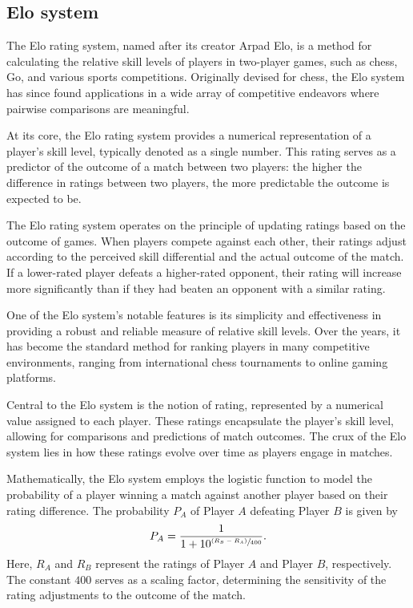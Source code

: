 \documentclass[preprint,aps,nofootinbib,a4paper,superscriptaddress,longbibliography,amsfonts,amssymb,amsmath,titlepage]{revtex4-2}
\begin{document}

\subsection{Elo system}

The Elo rating system, named after its creator Arpad Elo, is a method for calculating the relative skill levels of players in two-player games, such as chess, Go, and various sports competitions. Originally devised for chess, the Elo system has since found applications in a wide array of competitive endeavors where pairwise comparisons are meaningful.

At its core, the Elo rating system provides a numerical representation of a player's skill level, typically denoted as a single number. This rating serves as a predictor of the outcome of a match between two players: the higher the difference in ratings between two players, the more predictable the outcome is expected to be.

The Elo rating system operates on the principle of updating ratings based on the outcome of games. When players compete against each other, their ratings adjust according to the perceived skill differential and the actual outcome of the match. If a lower-rated player defeats a higher-rated opponent, their rating will increase more significantly than if they had beaten an opponent with a similar rating.

One of the Elo system's notable features is its simplicity and effectiveness in providing a robust and reliable measure of relative skill levels. Over the years, it has become the standard method for ranking players in many competitive environments, ranging from international chess tournaments to online gaming platforms.

Central to the Elo system is the notion of rating, represented by a numerical value assigned to each player. These ratings encapsulate the player's skill level, allowing for comparisons and predictions of match outcomes. The crux of the Elo system lies in how these ratings evolve over time as players engage in matches.

Mathematically, the Elo system employs the logistic function to model the probability of a player winning a match against another player based on their rating difference. The probability $P_A$ of Player $A$ defeating Player $B$ is given by
%
\begin{equation}\label{eq: elo-probablity}
P_A = \frac{1}{1 + 10^{\sfrac{(R_B - R_A)}{400}}}.
\end{equation}
%
Here, $R_A$ and $R_B$ represent the ratings of Player $A$ and Player $B$, respectively. The constant $400$ serves as a scaling factor, determining the sensitivity of the rating adjustments to the outcome of the match.
\end{document}
